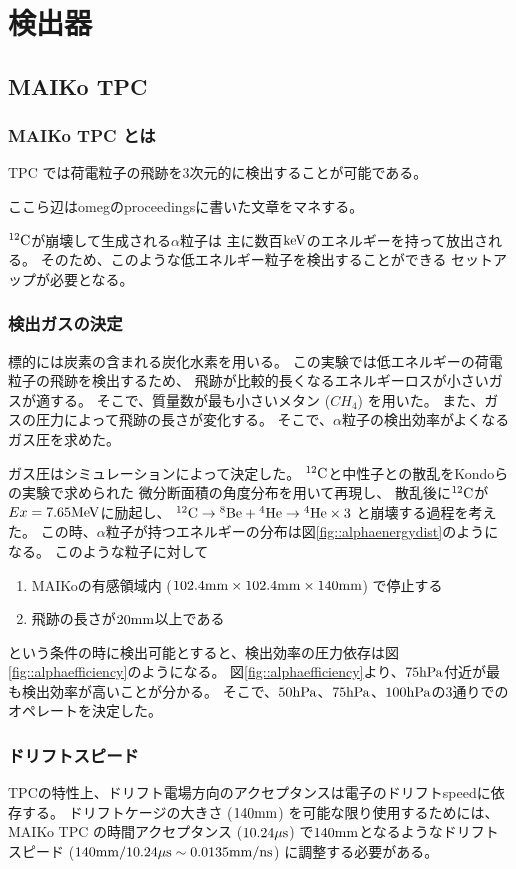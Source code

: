 \chapter{検出器}
\section{MAIKo TPC}
\subsection{MAIKo TPC とは}
TPC では荷電粒子の飛跡を3次元的に検出することが可能である。

ここら辺はomegのproceedingsに書いた文章をマネする。

${}^{12}\rm{C}$が崩壊して生成される$\alpha$粒子は
主に数百$\rm{keV}$のエネルギーを持って放出される。
そのため、このような低エネルギー粒子を検出することができる
セットアップが必要となる。

\subsection{検出ガスの決定}
標的には炭素の含まれる炭化水素を用いる。
この実験では低エネルギーの荷電粒子の飛跡を検出するため、
飛跡が比較的長くなるエネルギーロスが小さいガスが適する。
そこで、質量数が最も小さいメタン ($CH_{4}$) を用いた。
また、ガスの圧力によって飛跡の長さが変化する。
そこで、$\alpha$粒子の検出効率がよくなるガス圧を求めた。

ガス圧はシミュレーションによって決定した。
${}^{12}\rm{C}$と中性子との散乱をKondoらの実験で求められた
微分断面積の角度分布を用いて再現し、
散乱後に${}^{12}\rm{C}$が$Ex = 7.65\rm{MeV}$に励起し、
${}^{12}\rm{C}\rightarrow{}^{8}\rm{Be}+{}^{4}\rm{He}\rightarrow{}^{4}\rm{He}\times 3$
と崩壊する過程を考えた。
この時、$\alpha$粒子が持つエネルギーの分布は図\ref{fig::alphaenergydist}のようになる。
このような粒子に対して
\begin{enumerate}
\item
  MAIKoの有感領域内 ($102.4\rm{mm}\times 102.4\rm{mm}\times 140\rm{mm}$) で停止する
\item
  飛跡の長さが$20\rm{mm}$以上である
\end{enumerate}
という条件の時に検出可能とすると、検出効率の圧力依存は図\ref{fig::alphaefficiency}のようになる。
図\ref{fig::alphaefficiency}より、$75\rm{hPa}$付近が最も検出効率が高いことが分かる。
そこで、$50\rm{hPa}$、$75\rm{hPa}$、$100\rm{hPa}$の3通りでのオペレートを決定した。

\subsection{ドリフトスピード}
TPCの特性上、ドリフト電場方向のアクセプタンスは電子のドリフトspeedに依存する。
ドリフトケージの大きさ ($140\rm{mm}$) を可能な限り使用するためには、
MAIKo TPC の時間アクセプタンス ($10.24\rm{\mu s}$) で$140\rm{mm}$となるようなドリフトスピード
 ($140\rm{mm}/10.24\rm{\mu s} \sim 0.0135\rm{mm/ns}$) に調整する必要がある。

